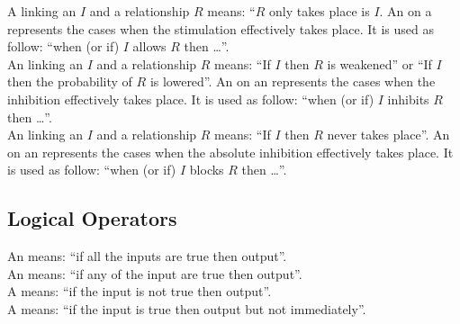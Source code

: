\noindent
A  linking an  $I$ and a relationship $R$ means: ``$R$ only takes place is $I$. An  on a  represents the cases when the stimulation effectively takes place. It is used as follow: ``when (or if) $I$ allows $R$ then \ldots''.\\[\baselineskip]

\noindent
An  linking an  $I$ and a relationship $R$ means: ``If $I$ then $R$ is weakened'' or ``If $I$ then the probability of $R$ is lowered''. An  on an  represents the cases when the inhibition effectively takes place. It is used as follow: ``when (or if) $I$ inhibits $R$ then \ldots''.\\[\baselineskip]

\noindent
An  linking an  $I$ and a relationship $R$ means: ``If $I$ then $R$ never takes place''. An  on an  represents the cases when the absolute inhibition effectively takes place. It is used as follow: ``when (or if) $I$ blocks $R$ then \ldots''.\\[\baselineskip]

\subsection{Logical Operators}

An  means: ``if all the inputs are true then output''.\\[\baselineskip]

\noindent
An  means: ``if any of the input are true then output''.\\[\baselineskip]

\noindent
A  means: ``if the input is not true then output''.\\[\baselineskip]

\noindent
A  means: ``if the input is true then output but not immediately''.\\[\baselineskip]


\normalcolor

